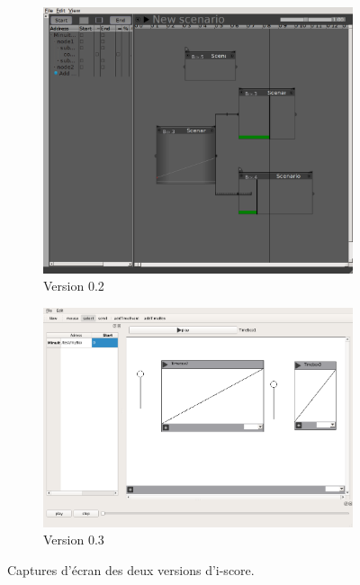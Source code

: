 \begin{figure}[H]
	\centering
	\begin{subfigure}{.5\textwidth}
		\centering
		\includegraphics[scale=0.2]{images/iscore02.png}
		\caption{Version 0.2}
	\end{subfigure} 
	
	\vspace{1em}
	
	\begin{subfigure}{.5\textwidth}
		\centering
		\includegraphics[scale=0.2]{images/iscore03.png}
		\caption{Version 0.3}
	\end{subfigure}
	
	\caption{Captures d'écran des deux versions d'i-score.}
	\label{figIScore}
\end{figure}

